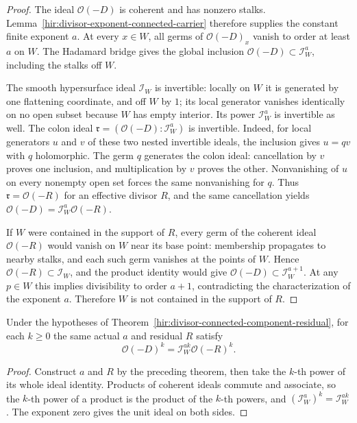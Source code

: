 \begin{proof}
The ideal $\mathcal O(-D)$ is coherent and has nonzero stalks.
Lemma~\ref{hir:divisor-exponent-connected-carrier} therefore supplies
the constant finite exponent $a$. At every $x\in W$, all germs of
$\mathcal O(-D)_x$ vanish to order at least $a$ on $W$. The Hadamard
bridge gives the global inclusion
$\mathcal O(-D)\subset\mathcal I_W^a$, including the stalks off $W$.

The smooth hypersurface ideal $\mathcal I_W$ is invertible: locally
on $W$ it is generated by one flattening coordinate, and off $W$
by $1$; its local generator vanishes identically on no open subset
because $W$ has empty interior. Its power $\mathcal I_W^a$ is
invertible as well. The colon ideal
$\mathfrak r=(\mathcal O(-D):\mathcal I_W^a)$ is invertible.
Indeed, for local generators $u$ and $v$ of these two nested
invertible ideals, the inclusion gives $u=qv$ with $q$ holomorphic.
The germ $q$ generates the colon ideal: cancellation by $v$ proves
one inclusion, and multiplication by $v$ proves the other.
Nonvanishing of $u$ on every nonempty open set forces the same
nonvanishing for $q$. Thus $\mathfrak r=\mathcal O(-R)$ for an
effective divisor $R$, and the same cancellation yields
$\mathcal O(-D)=\mathcal I_W^a\mathcal O(-R)$.

If $W$ were contained in the support of $R$, every germ of the
coherent ideal $\mathcal O(-R)$ would vanish on $W$ near its base
point: membership propagates to nearby stalks, and each such germ
vanishes at the points of $W$. Hence
$\mathcal O(-R)\subset\mathcal I_W$, and the product identity would
give $\mathcal O(-D)\subset\mathcal I_W^{a+1}$.
At any $p\in W$ this implies divisibility to order $a+1$, contradicting
the characterization of the exponent $a$. Therefore $W$ is not
contained in the support of $R$.
\end{proof}

\begin{corollary}
\label{hir:divisor-connected-component-residual-power}
\leanok
Under the hypotheses of Theorem~\ref{hir:divisor-connected-component-residual},
for each $k\geq0$ the same actual $a$ and residual $R$ satisfy
\[
 \mathcal O(-D)^k=\mathcal I_W^{ak}\mathcal O(-R)^k.
\]
\end{corollary}
\begin{proof}
Construct $a$ and $R$ by the preceding theorem, then take the $k$-th
power of its whole ideal identity. Products of coherent ideals commute
and associate, so the $k$-th power of a product is the product of the
$k$-th powers, and $(\mathcal I_W^a)^k=\mathcal I_W^{ak}$.
The exponent zero gives the unit ideal on both sides.
\end{proof}

